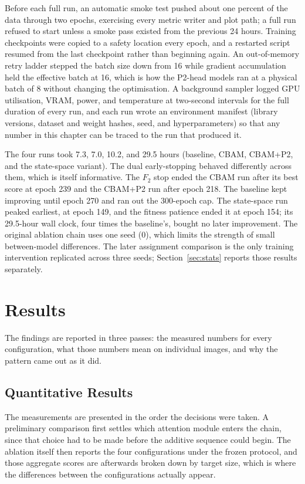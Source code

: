 Before each full run, an automatic smoke test pushed about one percent of the
data through two epochs, exercising every metric writer and plot path; a full
run refused to start unless a smoke pass existed from the previous 24 hours.
Training checkpoints were copied to a safety location every epoch, and a
restarted script resumed from the last checkpoint rather than beginning
again. An out-of-memory retry ladder stepped the batch size down from 16
while gradient accumulation held the effective batch at 16, which is how the
P2-head models ran at a physical batch of 8 without changing the
optimisation. A background sampler logged GPU utilisation, VRAM, power, and
temperature at two-second intervals for the full duration of every run, and
each run wrote an environment manifest (library versions, dataset and weight
hashes, seed, and hyperparameters) so that any number in this chapter can be
traced to the run that produced it.

The four runs took 7.3, 7.0, 10.2, and 29.5 hours (baseline, CBAM, CBAM+P2,
and the state-space variant). The dual early-stopping behaved differently
across them, which is itself informative. The $F_2$ stop ended the CBAM run
after its best score at epoch 239 and the CBAM+P2 run after epoch 218. The
baseline kept improving until epoch 270 and ran out the 300-epoch cap. The
state-space run peaked earliest, at epoch 149, and the fitness patience ended
it at epoch 154; its 29.5-hour wall clock, four times the baseline's, bought
no later improvement. The original ablation chain uses one seed (0), which
limits the strength of small between-model differences. The later assignment
comparison is the only training intervention replicated across three seeds;
Section~\ref{sec:stats} reports those results separately.

\section{Results}
\label{sec:results}
The findings are reported in three passes: the measured numbers for every
configuration, what those numbers mean on individual images, and why the
pattern came out as it did.

\subsection{Quantitative Results}
\label{sec:quant}

The measurements are presented in the order the decisions were taken. A
preliminary comparison first settles which attention module enters the chain,
since that choice had to be made before the additive sequence could begin. The
ablation itself then reports the four configurations under the frozen protocol,
and those aggregate scores are afterwards broken down by target size, which is
where the differences between the configurations actually appear.

